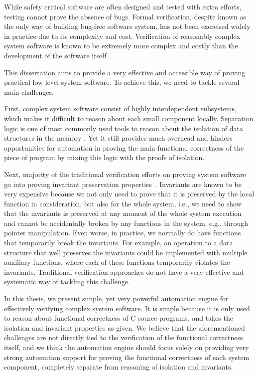 While safety critical software are often designed and tested with extra efforts, testing cannot
prove the absence of bugs. Formal verification, despite known as the only way of building
bug-free software system, has not been exercised widely in practice due to its complexity and cost.
Verification of reasonably complex system software is known to be extremely more complex and
costly than the development of the software itself~\cite{klein2009sel4,klein14}.

This dissertation aims to provide a very effective and accessible way of proving practical low level
system software. To achieve this, we need to tackle several main challenges.

First, complex system software consist of highly interdependent subsystems, which makes it
difficult to reason about each small component locally. Separation logic is one of most commonly
used tools to reason about the isolation of data structures in the memory
\cite{appel07:tphols,Tuch:2009}. Yet it still provides much overhead and hinders opportunities
for automation in proving the main functional correctness of the piece of program by mixing this
logic with the proofs of isolation.

Next, majority of the traditional verification efforts on proving system software go into proving
invariant preservation properties~\cite{klein14}. Invariants are known to be very expensive
because we not only need to prove that it is preserved by the local function in consideration,
but also for the whole system, i.e., we need to show that the invariants is preserved at any
moment of the whole system execution and cannot be accidentally broken by any functions
in the system, e.g., through pointer manipulation. Even worse, in practice, we normally do
have functions that temporarily break the invariants. For example, an operation to a data structure
that well preserves the invariants could be implemented with multiple auxiliary functions, where
each of these functions temporarily violates the invariants. Traditional verification approaches
do not have a very effective and systematic way of tackling this challenge.

In this thesis, we present simple, yet very powerful automation engine for effectively
verifying complex system software. It is simple because it is only used to reason
about functional correctness of C source programs, and takes the isolation
and invariant properties as given.
We believe that the aforementioned challenges are not directly tied to the verification
of the functional correctness itself, and we think the automation engine should focus solely
on providing
very strong automation support for proving the functional correctness of each system component,
completely separate from reasoning of isolation and invariants.


